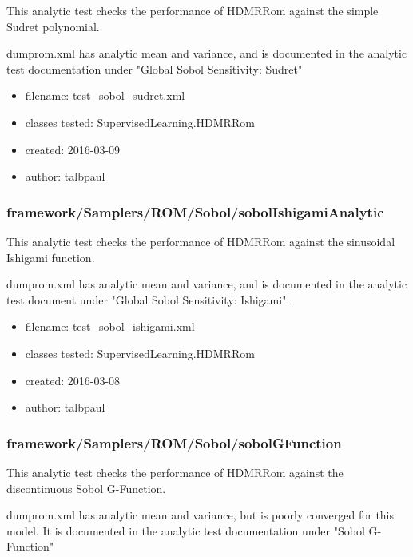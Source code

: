       This analytic test checks the performance of HDMRRom against the simple Sudret polynomial.
    

      
      dumprom.xml has analytic mean and variance, and is documented in the analytic test documentation
      under "Global Sobol Sensitivity: Sudret"
    
      \begin{itemize}
          \item filename: test\_sobol\_sudret.xml
          \item classes tested: SupervisedLearning.HDMRRom
          \item created: 2016-03-09
          \item author: talbpaul
      \end{itemize}
    \subsubsection{framework/Samplers/ROM/Sobol/sobolIshigamiAnalytic}
      
      This analytic test checks the performance of HDMRRom against the sinusoidal Ishigami function.
    

      
      dumprom.xml has analytic mean and variance, and is documented in the analytic test document
      under "Global Sobol Sensitivity: Ishigami".
    
      \begin{itemize}
          \item filename: test\_sobol\_ishigami.xml
          \item classes tested: SupervisedLearning.HDMRRom
          \item created: 2016-03-08
          \item author: talbpaul
      \end{itemize}
    \subsubsection{framework/Samplers/ROM/Sobol/sobolGFunction}
      
      This analytic test checks the performance of HDMRRom against the discontinuous Sobol G-Function.
    

      
      dumprom.xml has analytic mean and variance, but is poorly converged for this model.  It is documented
      in the analytic test documentation under "Sobol G-Function"
    
